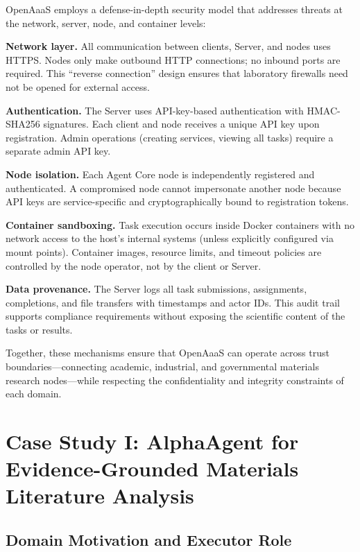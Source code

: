 \documentclass{article}
\begin{document}
OpenAaaS employs a defense-in-depth security model that addresses threats at the network, server, node, and container levels:

\textbf{Network layer.} All communication between clients, Server, and nodes uses HTTPS. Nodes only make outbound HTTP connections; no inbound ports are required. This ``reverse connection'' design ensures that laboratory firewalls need not be opened for external access.

\textbf{Authentication.} The Server uses API-key-based authentication with HMAC-SHA256 signatures. Each client and node receives a unique API key upon registration. Admin operations (creating services, viewing all tasks) require a separate admin API key.

\textbf{Node isolation.} Each Agent Core node is independently registered and authenticated. A compromised node cannot impersonate another node because API keys are service-specific and cryptographically bound to registration tokens.

\textbf{Container sandboxing.} Task execution occurs inside Docker containers with no network access to the host's internal systems (unless explicitly configured via mount points). Container images, resource limits, and timeout policies are controlled by the node operator, not by the client or Server.

\textbf{Data provenance.} The Server logs all task submissions, assignments, completions, and file transfers with timestamps and actor IDs. This audit trail supports compliance requirements without exposing the scientific content of the tasks or results.

Together, these mechanisms ensure that OpenAaaS can operate across trust boundaries---connecting academic, industrial, and governmental materials research nodes---while respecting the confidentiality and integrity constraints of each domain.


\section{Case Study I: AlphaAgent for Evidence-Grounded Materials Literature Analysis}
\label{sec:case1}

\subsection{Domain Motivation and Executor Role}
\end{document}
